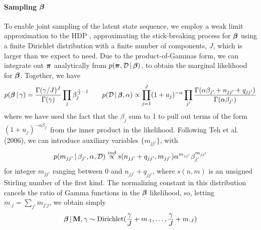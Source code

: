 \paragraph{Sampling \texorpdfstring{$\boldsymbol{\beta}$}{beta}}
\label{sec:sampling-bbeta}
To enable joint sampling of the latent state sequence, we employ a
weak limit approximation to the HDP \cite{johnson2013bayesian}, approximating the stick-breaking
process for $\boldsymbol{\beta}$ using a finite Dirichlet distribution with a
finite number of components, $J$, which is larger than we expect to
need.  Due to the product-of-Gammas form, we can integrate out $\boldsymbol{\pi}$ 
analytically from $p(\boldsymbol{\pi}, \mathcal{D} \, \vert \, \boldsymbol{\beta})$, to obtain the
marginal likelihood for $\boldsymbol{\beta}$.  Together, we have
\begin{align}
\label{eq:beta-prior-likelihood}
  p(\boldsymbol{\beta} \, \vert \, \gamma) = \frac{\Gamma(\gamma /
    J)^J}{\Gamma(\gamma)} \prod_{j} \beta_{j}^{\frac{\gamma}{J} - 1} \qquad
  p(\mathcal{D} \, \vert \, \boldsymbol{\beta}, \alpha) \propto
  \prod_{j=1}^J (1+u_j)^{-\alpha} \prod_{j'}
    \frac{\Gamma(\alpha\beta_{j'} + n_{jj'} +
    q_{jj'})}{\Gamma(\alpha\beta_{j'})} 
\end{align}
 where we have used the fact that the $\beta_j$ sum to 1 to pull out
 terms of the form $(1 + u_j)^{-\alpha\beta_{j'}}$ from the inner
 product in the likelihood.  Following Teh et al. (2006), 
we can introduce auxiliary variables $\{m_{jj'}\}$, with
\begin{equation}
  \label{eq:m-distribution}
  p(m_{jj'} \, \vert \, \beta_{j'}, \alpha, \mathcal{D}) \stackrel{ind}{\propto}
  s(n_{jj'} + q_{jj'}, m_{jj'}) \alpha^{m_{jj'}}
    \beta_{j'}^{m_{jj'}}
\end{equation}
for integer $m_{jj'}$ ranging between $0$ and $n_{jj'} + q_{jj'}$,
where $s(n,m)$ is an unsigned Stirling number of the first kind.
The normalizing constant in this distribution cancels the ratio of
Gamma functions in the $\boldsymbol{\beta}$ likelihood, so, letting $m_{\cdot j} =
\sum_{j'} m_{j'j}$, we obtain simply
\begin{equation}
  \label{eq:beta-posterior}
  \boldsymbol{\beta} \, \vert \, \mathbf{M}, \gamma \sim \mathrm{Dirichlet}(\frac{\gamma}{J} +
  m_{\cdot 1}, \dots, \frac{\gamma}{J} + m_{\cdot J})
\end{equation}

